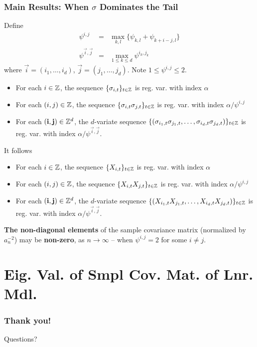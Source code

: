 \documentclass{beamer}
\begin{document}
\begin{frame}
  \frametitle{Main Results: When $\sigma$ Dominates the Tail}
  Define
  \begin{eqnarray*}
    \psi^{i,j} &=& \max_{k,l}\{\psi_{k,l} + \psi_{k+i-j, l}\} \\
    \psi^{\vec i, \vec j}
    &=&
    \max_{1 \leq k \leq d} \psi^{i_k, j_k}
  \end{eqnarray*}
  where $\vec i = (i_1, \dots, i_d)$, $\vec j = (j_1, \dots, j_d)$.
  Note $1 \leq \psi^{i,j} \leq 2$.
  \begin{itemize}
  \item For each $i \in \mathbb Z$, the sequence
    $\{\sigma_{i,t}\}_{t \in \mathbb Z}$ is reg. var. with index $\alpha$
  \item For each $(i, j) \in \mathbb Z$, the sequence
    $\{\sigma_{i,t} \sigma_{j,t}\}_{t \in \mathbb Z}$ is
    reg. var. with index $\alpha/\psi^{i,j}$
  \item For each $(\mathbf{i}, \mathbf{j}) \in \mathbb Z^d$, the $d$-variate
    sequence
    $\{(\sigma_{i_1,t} \sigma_{j_1,t}, \dots, \sigma_{i_d,t} \sigma_{j_d,t})\}_{t \in \mathbb Z}$ is
    reg. var. with index $\alpha/\psi^{\vec i, \vec j}$.
  \end{itemize}
\end{frame}

\begin{frame}
  It follows
  \begin{itemize}
  \item For each $i \in \mathbb Z$, the sequence
    $\{X_{i,t}\}_{t \in \mathbb Z}$ is reg. var. with index $\alpha$
  \item For each $(i, j) \in \mathbb Z$, the sequence
    $\{X_{i,t} X_{j,t}\}_{t \in \mathbb Z}$ is
    reg. var. with index $\alpha/\psi^{i,j}$
  \item For each $(\mathbf{i}, \mathbf{j}) \in \mathbb Z^d$, the $d$-variate
    sequence
    $\{(X_{i_1,t} X_{j_1,t}, \dots, X_{i_d,t} X_{j_d,t})\}_{t \in \mathbb Z}$ is
    reg. var. with index $\alpha/\psi^{\vec i, \vec j}$.
  \end{itemize}
  {\bf The non-diagonal elements} of the sample covariance
    matrix (normalized by $a_n^{-2}$) may be {\bf non-zero}, as
    $n \to \infty$ -- when $\psi^{i,j} = 2$ for some $i \neq j$.
  
\end{frame}


\section{Eig. Val. of Smpl Cov. Mat. of Lnr. Mdl.}

\begin{frame}
   \frametitle{Thank you!}
   Questions?
 \end{frame}


\end{document}
